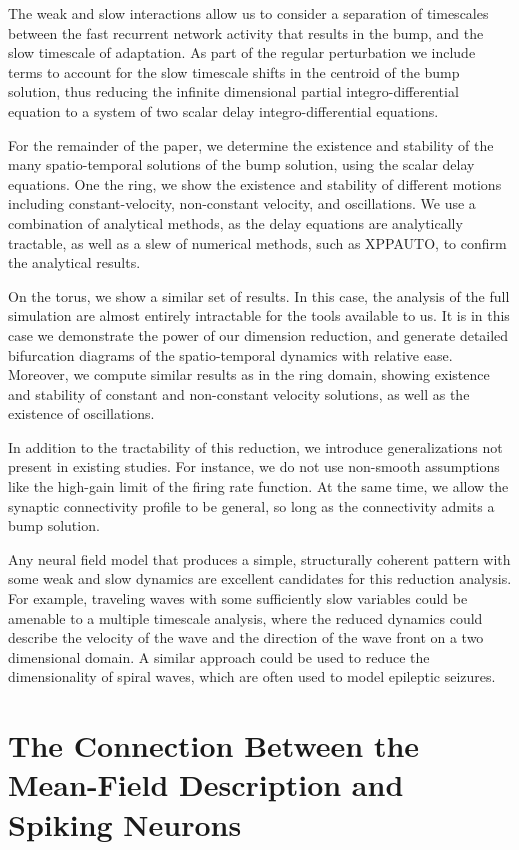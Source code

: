 \documentclass[a4paper,11pt]{article}
\begin{document}
The weak and slow interactions allow us to consider a separation of timescales between the fast recurrent network activity that results in the bump, and the slow timescale of adaptation. As part of the regular perturbation we include terms to account for the slow timescale shifts in the centroid of the bump solution, thus reducing the infinite dimensional partial integro-differential equation to a system of two scalar delay integro-differential equations.

For the remainder of the paper, we determine the existence and stability of the many spatio-temporal solutions of the bump solution, using the scalar delay equations. One the ring, we show the existence and stability of different motions including constant-velocity, non-constant velocity, and oscillations. We use a combination of analytical methods, as the delay equations are analytically tractable, as well as a slew of numerical methods, such as XPPAUTO\cite{xpp}, to confirm the analytical results.

On the torus, we show a similar set of results. In this case, the analysis of the full simulation are almost entirely intractable for the tools available to us. It is in this case we demonstrate the power of our dimension reduction, and generate detailed bifurcation diagrams of the spatio-temporal dynamics with relative ease. Moreover, we compute similar results as in the ring domain, showing existence and stability of constant and non-constant velocity solutions, as well as the existence of oscillations.

In addition to the tractability of this reduction, we introduce generalizations not present in existing studies. For instance, we do not use non-smooth assumptions like the high-gain limit of the firing rate function. At the same time, we allow the synaptic connectivity profile to be general, so long as the connectivity admits a bump solution.

Any neural field model that produces a simple, structurally coherent pattern with some weak and slow dynamics are excellent candidates for this reduction analysis. For example, traveling waves with some sufficiently slow variables could be amenable to a multiple timescale analysis, where the reduced dynamics could describe the velocity of the wave and the direction of the wave front on a two dimensional domain. A similar approach could be used to reduce the dimensionality of spiral waves, which are often used to model epileptic seizures.

\section{The Connection Between the Mean-Field Description and Spiking Neurons}
\end{document}
